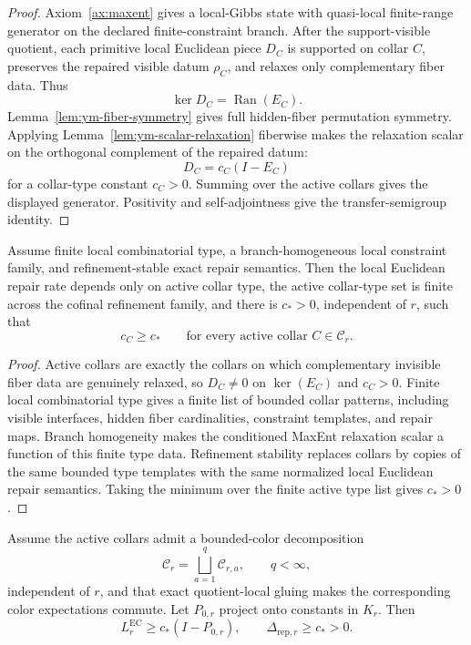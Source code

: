 \begin{proof}
Axiom~\ref{ax:maxent} gives a local-Gibbs state with quasi-local finite-range generator on the
declared finite-constraint branch. After the support-visible quotient, each primitive local
Euclidean piece \(D_C\) is supported on collar \(C\), preserves the repaired visible datum
\(\rho_C\), and relaxes only complementary fiber data. Thus
\[
\ker D_C=\operatorname{Ran}(E_C).
\]
Lemma~\ref{lem:ym-fiber-symmetry} gives full hidden-fiber permutation symmetry. Applying
Lemma~\ref{lem:ym-scalar-relaxation} fiberwise makes the relaxation scalar on the orthogonal
complement of the repaired datum:
\[
D_C=c_C(I-E_C)
\]
for a collar-type constant \(c_C>0\). Summing over the active collars gives the displayed
generator. Positivity and self-adjointness give the transfer-semigroup identity.
\end{proof}

\begin{lemma}
\label{lem:repair-rate-floor}
Assume finite local combinatorial type, a branch-homogeneous local constraint family, and
refinement-stable exact repair semantics. Then the local Euclidean repair rate depends only on
active collar type, the active collar-type set is finite across the cofinal refinement family, and
there is \(c_*>0\), independent of \(r\), such that
\[
c_C\ge c_*
\qquad\text{for every active collar }C\in\mathcal C_r.
\]
\end{lemma}

\begin{proof}
Active collars are exactly the collars on which complementary invisible fiber data are genuinely
relaxed, so \(D_C\neq0\) on \(\ker(E_C)\) and \(c_C>0\). Finite local combinatorial type gives a
finite list of bounded collar patterns, including visible interfaces, hidden fiber cardinalities,
constraint templates, and repair maps. Branch homogeneity makes the conditioned MaxEnt relaxation
scalar a function of this finite type data. Refinement stability replaces collars by copies of the
same bounded type templates with the same normalized local Euclidean repair semantics. Taking the
minimum over the finite active type list gives \(c_*>0\).
\end{proof}

\begin{proposition}
\label{prop:finite-stage-repair-gap}
Assume the active collars admit a bounded-color decomposition
\[
\mathcal C_r=\bigsqcup_{a=1}^{q}\mathcal C_{r,a},
\qquad q<\infty,
\]
independent of \(r\), and that exact quotient-local gluing makes the corresponding color
expectations commute. Let \(P_{0,r}\) project onto constants in \(K_r\). Then
\[
L_r^{\mathrm{EC}}\ge c_*(I-P_{0,r}),
\qquad
\Delta_{\mathrm{rep},r}\ge c_*>0.
\]
\end{proposition}

